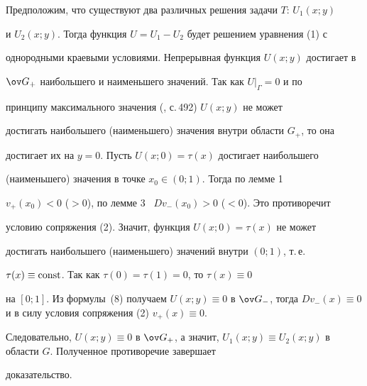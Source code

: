 Предположим, что существуют два различных решения задачи $T$: $U_1(x;y)$ 


и $U_2(x;y)$. Тогда функция $U=U_1-U_2$ будет решением уравнения (1) с 


однородными краевыми условиями. Непрерывная функция $U(x;y)$ достигает в 


$\ov G_+$ наибольшего и наименьшего значений. Так как $U|_\Gamma=0$ и по 


принципу максимального значения (\cite{1}, с.\,492) $U(x;y)$ не может 


достигать наибольшего (наименьшего) значения внутри области $G_+$, то она 


достигает их на $y=0$. Пусть $U(x;0)=\tau(x)$ достигает наибольшего 


(наименьшего) значения в точке $x_0\in(0;1)$. Тогда по лемме 1 \ 


$v_+(x_0)<0$ ($>0$), по лемме 3 \ $D v_-(x_0)>0$ ($<0$). Это противоречит 


условию сопряжения (2). Значит, функция $U(x;0)=\tau(x)$ не может 


достигать наибольшего (наименьшего) значений внутри $(0;1)$, т.\,е. 


$\tau(x)\equiv\operatorname{const}$. Так как $\tau(0)=\tau(1)=0$, то $\tau(x)\equiv0$ 


на $[0;1]$. Из формулы~(8) получаем $U(x;y)\equiv0$ в $\ov G_-$, тогда $D 


v_-(x)\equiv0$ и в силу условия сопряжения (2) $v_+(x)\equiv0$. 


Следовательно, $U(x;y)\equiv0$ в $\ov G_+$, а значит, $U_1(x;y)\equiv 


U_2(x;y)$ в области $G$. Полученное противоречие завершает 


доказательство. 


 


 


